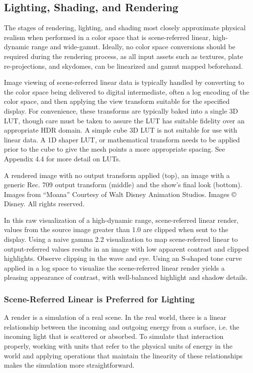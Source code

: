 \subsection{Lighting, Shading, and Rendering}

The stages of rendering, lighting, and shading most closely approximate physical realism when performed in a color space that is scene-referred linear, high-dynamic range and wide-gamut. Ideally, no color space conversions should be required during the rendering process, as all input assets such as textures, plate re-projections, and skydomes, can be linearized and gamut mapped beforehand.

Image viewing of scene-referred linear data is typically handled by converting to the color space being delivered to digital intermediate, often a log encoding of the color space, and then applying the view transform suitable for the specified display. For convenience, these transforms are typically baked into a single 3D LUT, though care must be taken to assure the LUT has suitable fidelity over an appropriate HDR domain. A simple cube 3D LUT is not suitable for use with linear data. A 1D shaper LUT, or mathematical transform needs to be applied prior to the cube to give the mesh points a more appropriate spacing. See Appendix 4.4 for more detail on LUTs.



A rendered image with no output transform applied (top), an image with a generic Rec. 709 output transform (middle) and the show’s final look (bottom).
Images from “Moana” Courtesy of Walt Disney Animation Studios. Images © Disney. All rights reserved.

In this raw visualization of a high-dynamic range, scene-referred linear render, values from the source image greater than 1.0 are clipped when sent to the display. Using a naive gamma 2.2 visualization to map scene-referred linear to output-referred values results in an image with low apparent contrast and clipped highlights. Observe clipping in the wave and eye. Using an S-shaped tone curve applied in a log space to visualize the scene-referred linear render yields a pleasing appearance of contrast, with well-balanced highlight and shadow details.

\subsubsection{Scene-Referred Linear is Preferred for Lighting}

A render is a simulation of a real scene. In the real world, there is a linear relationship between the incoming and outgoing energy from a surface, i.e. the incoming light that is scattered or absorbed. To simulate that interaction properly, working with units that refer to the physical units of energy in the world and applying operations that maintain the linearity of these relationships makes the simulation more straightforward.

